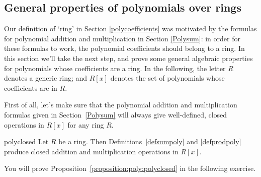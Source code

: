 %
%
%
%
%



\subsection{General properties of polynomials over rings}\label{polyringring}

Our definition of `ring' in Section \ref{polycoefficients} was motivated by the formulas for polynomial addition and  multiplication   in Section \ref{Polysum}: in order for these formulas to work, the polynomial coefficients should belong to a ring. In this section we'll take the next step, and prove some general algebraic properties for polynomials whose coefficients  are a ring. 
In the following,  the letter $R$ denotes a generic ring; and $R[x]$ denotes the set of polynomials  whose coefficients are in $R$.

First of all, let's make sure that the polynomial addition and multiplication formulas given in Section~\ref{Polysum} will always give well-defined, closed operations in $R[x]$ for any ring $R$. 

\begin{prop}{polyclosed} Let $R$ be a ring. Then Definitions~\ref{defsumpoly} and \ref{defprodpoly} produce  closed addition and multiplication operations in $R[x]$.
\end{prop}

You will prove Proposition~\ref{proposition:poly:polyclosed} in the following exercise.

